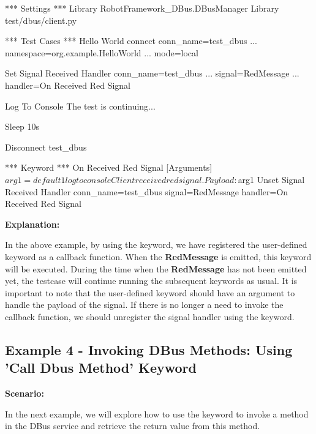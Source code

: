 \begin{robotcode}
*** Settings ***
Library    RobotFramework_DBus.DBusManager
Library    test/dbus/client.py

*** Test Cases ***
Hello World
   connect    conn_name=test_dbus
   ...        namespace=org.example.HelloWorld
   ...        mode=local

   Set Signal Received Handler    conn_name=test_dbus
   ...                            signal=RedMessage
   ...                            handler=On Received Red Signal

   Log To Console    The test is continuing...

   Sleep    10s

   Disconnect    test_dbus

*** Keyword ***
On Received Red Signal
   [Arguments]    ${arg1}=default 1
   log to console      Client received red signal. Payload: ${arg1}
   Unset Signal Received Handler    conn_name=test_dbus    signal=RedMessage    handler=On Received Red Signal
\end{robotcode}

\textbf{Explanation:}

In the above example, by using the  keyword, we have registered the user-defined keyword  as a callback function.
When the \textbf{RedMessage} is emitted, this keyword will be executed. During the time when the \textbf{RedMessage} has not been emitted yet, the testcase will continue running the
subsequent keywords as usual. It is important to note that the user-defined keyword should have an argument to handle the payload of the signal. If there is no longer a need to invoke
the callback function, we should unregister the signal handler using the  keyword.


\newpage
\hypertarget{description-example4}{%
\subsection{\texorpdfstring{\textbf{Example 4 - Invoking DBus Methods: Using 'Call Dbus Method' Keyword}}{Example 4 - Invoking DBus Methods: Using 'Call Dbus Method' Keyword}}\label{description-example4}}

\textbf{Scenario:}

In the next example, we will explore how to use the  keyword to invoke a method in the DBus service and retrieve the return value from this method.


